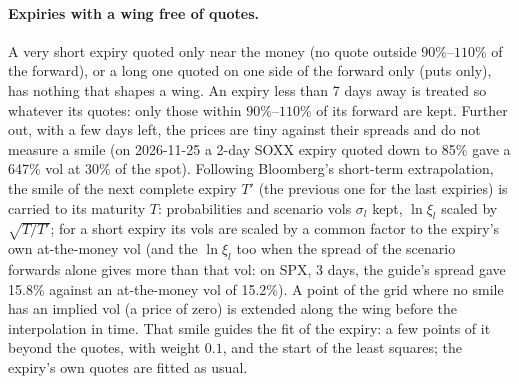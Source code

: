 \paragraph{Expiries with a wing free of quotes.} A very short expiry quoted only near the money (no quote outside
$90\%$--$110\%$ of the forward), or a long one quoted on one side of the forward only (puts only), has nothing that
shapes a wing. An expiry less than 7 days away is treated so whatever its quotes: only those within $90\%$--$110\%$
of its forward are kept. Further out, with a few days left, the prices are tiny against their spreads and do not
measure a smile (on 2026-11-25 a 2-day SOXX expiry quoted down to 85\% gave a 647\% vol at 30\% of the spot).
Following Bloomberg's short-term extrapolation, the smile of the next complete expiry $T'$ (the
previous one for the last expiries) is carried to its maturity $T$: probabilities and scenario vols $\sigma_l$ kept,
$\ln\xi_l$ scaled by $\sqrt{T/T'}$; for a short expiry its vols are scaled by a common factor to the expiry's own
at-the-money vol (and the $\ln\xi_l$ too when the spread of the scenario forwards alone gives more than that vol:
on SPX, 3 days, the guide's spread gave 15.8\% against an at-the-money vol of 15.2\%). A point of the grid where no
smile has an implied vol (a price of zero) is extended along the wing before the interpolation in time. That smile guides the fit of the expiry: a few points of it beyond the quotes, with weight $0.1$, and
the start of the least squares; the expiry's own quotes are fitted as usual.

